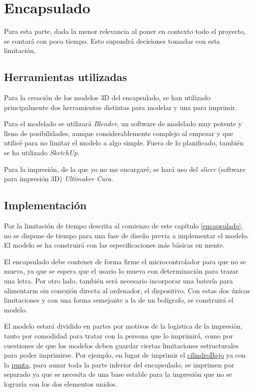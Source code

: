 \chapter{Encapsulado\label{encapsulado}}
Para esta parte, dada la menor relevancia al poner en contexto todo el proyecto, se
contará con poco tiempo. Esto supondrá decisiones tomadas con esta limitación,
\section{Herramientas utilizadas}
Para la creación de los modelos 3D del encapsulado, se han utilizado principalmente
dos herramientas distintas para modelar y una para imprimir.

Para el modelado se utilizará \textit{Blender}, un software de modelado muy potente
y lleno de posibilidades, aunque considerablemente complejo al empezar y que utilicé
para no limitar el modelo a algo simple. Fuera de lo
planificado, también se ha utilizado \textit{SketchUp}.

Para la impresión, de la que yo no me encargaré, se hará uso del \textit{slicer}
(software para impresión 3D) \textit{Ultimaker Cura}.

\section{Implementación}
Por la limitación de tiempo descrita al comienzo de este capítulo \ref{encapsulado},
no se dispone de tiempo para una fase de diseño previa a implementar el modelo.
El modelo se ha construirá con las especificaciones más básicas en mente.

El encapsulado debe contener de forma firme el microcontrolador para que no se mueva,
ya que se espera que el usario lo mueva con determinación para trazar una letra. Por
otro lado, también será necesario incorporar una batería para alimentarm sin conexión
directa al ordenador, el dispositivo. Con estas dos únicas limitaciones y con una forma
semejante a la de un bolígrafo, se construirá el modelo.

El modelo estará dividido en partes por motivos de la logística de la impresión, tanto
por comodidad para tratar con la persona que lo imprimirá, como por cuestiones de que los
modelos deben guardar ciertas limitaciones estructurales para poder imprimirse. Por ejemplo,
en lugar de imprimir el
\href{https://github.com/AntonioPriego/SmartPen/tree/main/SmartPenModel/Components/cilindroBajo}{cilindroBajo}
ya con la 
\href{https://github.com/AntonioPriego/SmartPen/tree/main/SmartPenModel/Components/punta}{punta},
para aunar toda la parte inferior del encapsulado, se imprimen por separado ya que se necesita de
una base estable para la impresión que no se lograría con los dos elementos unidos.

